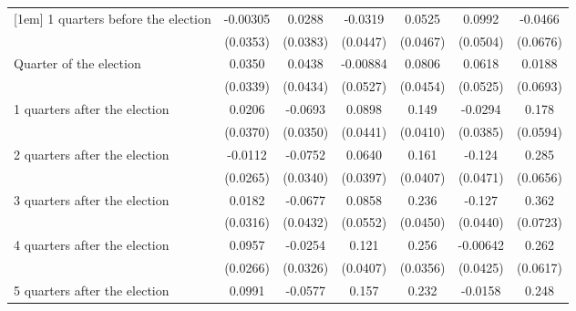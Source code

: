 \begin{table}[!ht]
\begin{tabular}{l*{6}{c}}
[1em]
 1 quarters before the election&    -0.00305         &      0.0288         &     -0.0319         &      0.0525         &      0.0992\sym{*}  &     -0.0466         \\
                    &    (0.0353)         &    (0.0383)         &    (0.0447)         &    (0.0467)         &    (0.0504)         &    (0.0676)         \\
[1em]
Quarter of the election&      0.0350         &      0.0438         &    -0.00884         &      0.0806         &      0.0618         &      0.0188         \\
                    &    (0.0339)         &    (0.0434)         &    (0.0527)         &    (0.0454)         &    (0.0525)         &    (0.0693)         \\
[1em]
 1 quarters after the election&      0.0206         &     -0.0693\sym{*}  &      0.0898\sym{*}  &       0.149\sym{***}&     -0.0294         &       0.178\sym{**} \\
                    &    (0.0370)         &    (0.0350)         &    (0.0441)         &    (0.0410)         &    (0.0385)         &    (0.0594)         \\
[1em]
 2 quarters after the election&     -0.0112         &     -0.0752\sym{*}  &      0.0640         &       0.161\sym{***}&      -0.124\sym{**} &       0.285\sym{***}\\
                    &    (0.0265)         &    (0.0340)         &    (0.0397)         &    (0.0407)         &    (0.0471)         &    (0.0656)         \\
[1em]
 3 quarters after the election&      0.0182         &     -0.0677         &      0.0858         &       0.236\sym{***}&      -0.127\sym{**} &       0.362\sym{***}\\
                    &    (0.0316)         &    (0.0432)         &    (0.0552)         &    (0.0450)         &    (0.0440)         &    (0.0723)         \\
[1em]
 4 quarters after the election&      0.0957\sym{***}&     -0.0254         &       0.121\sym{**} &       0.256\sym{***}&    -0.00642         &       0.262\sym{***}\\
                    &    (0.0266)         &    (0.0326)         &    (0.0407)         &    (0.0356)         &    (0.0425)         &    (0.0617)         \\
[1em]
 5 quarters after the election&      0.0991\sym{***}&     -0.0577         &       0.157\sym{***}&       0.232\sym{***}&     -0.0158         &       0.248\sym{***}\\

\end{tabular}
\end{table}
